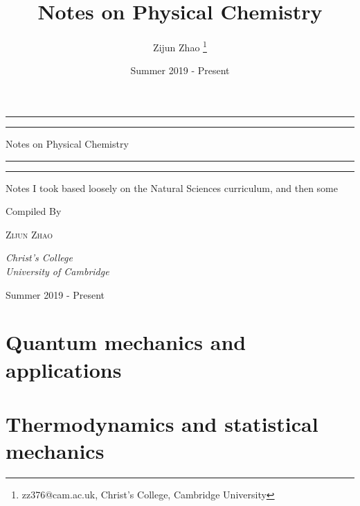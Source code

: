 \documentclass[a4paper,11pt]{book}
\title{\textbf{Notes on Physical Chemistry}}
\author{Zijun Zhao \thanks{zz376@cam.ac.uk, Christ's College, Cambridge University}}
\date{Summer 2019 - Present}
\numberwithin{equation}{section}
\theoremstyle{definition}
\begin{document}
\frontmatter

\begin{titlepage}
	\centering
	\normalfont
	\vspace*{\baselineskip}
	\rule{\textwidth}{1.6pt}\vspace*{-\baselineskip}\vspace*{2pt} %
	\rule{\textwidth}{0.4pt} %
	
	\vspace{0.75\baselineskip} %
	
	{\Huge Notes on Physical Chemistry} %
	
	\vspace{0.75\baselineskip} %
	
	\rule{\textwidth}{0.4pt}\vspace*{-\baselineskip}\vspace{3.2pt} %
	\rule{\textwidth}{1.6pt} %
	
	\vspace{2\baselineskip} %
	Notes I took based loosely on the Natural Sciences curriculum, and then some

	\vspace{3\baselineskip}
	Compiled By
	
	\vspace{0.5\baselineskip} %
	
	{\scshape\Large Zijun Zhao}
	\vspace{0.5\baselineskip} %
	
	\textit{Christ's College\\University of Cambridge} %
	
	\vfill %
	
	\vspace{0.3\baselineskip} %
	
	Summer 2019 - Present %
\end{titlepage}

\tableofcontents

\mainmatter
\part{Quantum mechanics and applications}





\part{Thermodynamics and statistical mechanics}


\appendix


\backmatter


\end{document}
